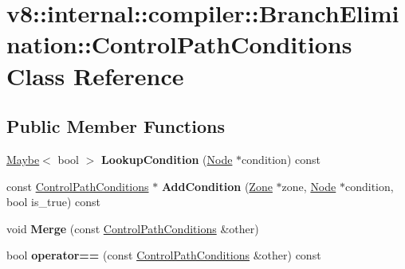 \hypertarget{classv8_1_1internal_1_1compiler_1_1_branch_elimination_1_1_control_path_conditions}{}\section{v8\+:\+:internal\+:\+:compiler\+:\+:Branch\+Elimination\+:\+:Control\+Path\+Conditions Class Reference}
\label{classv8_1_1internal_1_1compiler_1_1_branch_elimination_1_1_control_path_conditions}
\subsection*{Public Member Functions}
\begin{DoxyCompactItemize}
\item 
\hyperlink{classv8_1_1_maybe}{Maybe}$<$ bool $>$ {\bfseries Lookup\+Condition} (\hyperlink{classv8_1_1internal_1_1compiler_1_1_node}{Node} $\ast$condition) const \hypertarget{classv8_1_1internal_1_1compiler_1_1_branch_elimination_1_1_control_path_conditions_a8e0af18dd57dea2a827bb17c213b353f}{}\label{classv8_1_1internal_1_1compiler_1_1_branch_elimination_1_1_control_path_conditions_a8e0af18dd57dea2a827bb17c213b353f}

\item 
const \hyperlink{classv8_1_1internal_1_1compiler_1_1_branch_elimination_1_1_control_path_conditions}{Control\+Path\+Conditions} $\ast$ {\bfseries Add\+Condition} (\hyperlink{classv8_1_1internal_1_1_zone}{Zone} $\ast$zone, \hyperlink{classv8_1_1internal_1_1compiler_1_1_node}{Node} $\ast$condition, bool is\+\_\+true) const \hypertarget{classv8_1_1internal_1_1compiler_1_1_branch_elimination_1_1_control_path_conditions_a2a251b719ca0dd07feebe5df034a74f4}{}\label{classv8_1_1internal_1_1compiler_1_1_branch_elimination_1_1_control_path_conditions_a2a251b719ca0dd07feebe5df034a74f4}

\item 
void {\bfseries Merge} (const \hyperlink{classv8_1_1internal_1_1compiler_1_1_branch_elimination_1_1_control_path_conditions}{Control\+Path\+Conditions} \&other)\hypertarget{classv8_1_1internal_1_1compiler_1_1_branch_elimination_1_1_control_path_conditions_a7ff58166bf9e85c6d5393cbf3d46741c}{}\label{classv8_1_1internal_1_1compiler_1_1_branch_elimination_1_1_control_path_conditions_a7ff58166bf9e85c6d5393cbf3d46741c}

\item 
bool {\bfseries operator==} (const \hyperlink{classv8_1_1internal_1_1compiler_1_1_branch_elimination_1_1_control_path_conditions}{Control\+Path\+Conditions} \&other) const \hypertarget{classv8_1_1internal_1_1compiler_1_1_branch_elimination_1_1_control_path_conditions_a3466f458799259a54e2a81cb50fa36c3}{}\label{classv8_1_1internal_1_1compiler_1_1_branch_elimination_1_1_control_path_conditions_a3466f458799259a54e2a81cb50fa36c3}


\end{DoxyCompactItemize}

